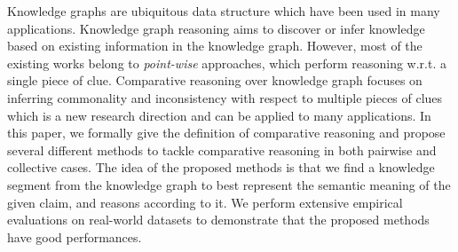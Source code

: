 

Knowledge graphs are ubiquitous data structure which have been used in many applications. 
Knowledge graph reasoning aims to discover or infer knowledge based on existing information in the knowledge graph.
However, most of the existing works belong to {\em point-wise} approaches, which perform reasoning w.r.t. a single piece of clue.
Comparative reasoning over knowledge graph focuses on inferring commonality and inconsistency with respect to multiple pieces of clues which is a new research direction and can be applied to many applications. 
In this paper, we formally give the definition of comparative reasoning and propose several different methods to tackle comparative reasoning in both pairwise and collective cases. 
The idea of the proposed methods is that we find a knowledge segment from the knowledge graph to best represent the semantic meaning of the given claim, and reasons according to it.
We perform extensive empirical evaluations on real-world datasets to demonstrate that the proposed methods have good performances.



